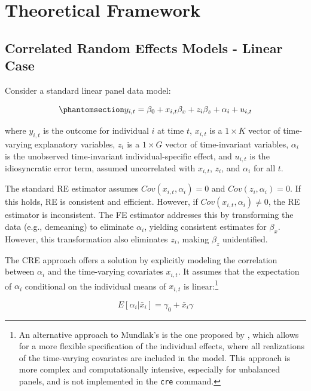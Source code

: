 \documentclass[bib]{statapress}
\begin{document}
\section{Theoretical Framework}\label{sec-2}

\subsection{Correlated Random Effects Models - Linear
Case}\label{sec-2-1}

Consider a standard linear panel data model:

\begin{equation}\phantomsection\label{eq-cre-1}{y_{i,t} = \beta_0 + x_{i,t}\beta_x + z_{i}\beta_z  + \alpha_i + u_{i,t}
}\end{equation}

where \(y_{i,t}\) is the outcome for individual \(i\) at time \(t\),
\(x_{i,t}\) is a \(1 \times K\) vector of time-varying explanatory
variables, \(z_i\) is a \(1 \times G\) vector of time-invariant
variables, \(\alpha_i\) is the unobserved time-invariant
individual-specific effect, and \(u_{i,t}\) is the idiosyncratic error
term, assumed uncorrelated with \(x_{i,t}\), \(z_i\), and \(\alpha_i\)
for all \(t\).

The standard RE estimator assumes \(Cov(x_{i,t}, \alpha_i) = 0\) and
\(Cov(z_{i}, \alpha_i) = 0\). If this holds, RE is consistent and
efficient. However, if \(Cov(x_{i,t}, \alpha_i) \neq 0\), the RE
estimator is inconsistent. The FE estimator addresses this by
transforming the data (e.g., demeaning) to eliminate \(\alpha_i\),
yielding consistent estimates for \(\beta_x\). However, this
transformation also eliminates \(z_i\), making \(\beta_z\) unidentified.

The \citet{mundlak1978pooling} CRE approach offers a solution by
explicitly modeling the correlation between \(\alpha_i\) and the
time-varying covariates \(x_{i,t}\). It assumes that the expectation of
\(\alpha_i\) conditional on the individual means of \(x_{i,t}\) is
linear:\footnote{An alternative approach to Mundlak's is the one
  proposed by \citet{chamberlain1982multivariate}, which allows for a
  more flexible specification of the individual effects, where all
  realizations of the time-varying covariates are included in the model.
  This approach is more complex and computationally intensive,
  especially for unbalanced panels, and is not implemented in the
  \texttt{cre} command.}

\[E[\alpha_i | \bar x_{i}] = \gamma_0 + \bar x_{i}\gamma\]
\end{document}
